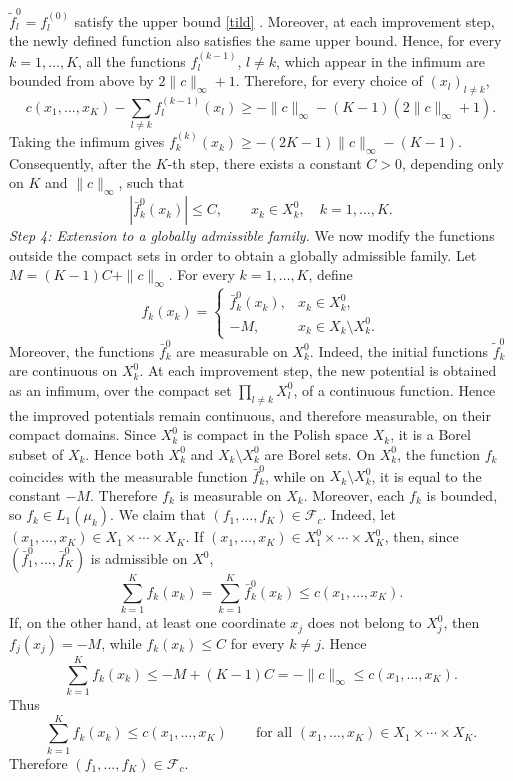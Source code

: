 \documentclass[twoside,11pt,a4paper]{article}
\newcommand*{\SavedEqref}{}
\let\SavedEqref\eqref
\renewcommand*{\eqref}[1]{  \begingroup
    \hypersetup{
      linkcolor=linkequation,
      linkbordercolor=linkequation,
    }    \SavedEqref{#1}  \endgroup
}
\begin{document}
\(\widetilde f_l^0=f_l^{(0)}\) satisfy the upper bound \eqref{tild}. Moreover,
at each improvement step, the newly defined function also satisfies the same
upper bound. Hence, for every \(k=1,\ldots,K\), all the functions
\(f_l^{(k-1)}\), \(l\ne k\), which appear in the infimum are bounded from above
by \(2\|c\|_\infty+1\). Therefore, for every choice of \((x_l)_{l\ne k}\),
\[
c(x_1,\ldots,x_K)
-
\sum_{l\ne k}f_l^{(k-1)}(x_l)
\ge
-\|c\|_\infty-(K-1)(2\|c\|_\infty+1).
\]
Taking the infimum gives $
f_k^{(k)}(x_k)
\ge
-(2K-1)\|c\|_\infty-(K-1)$.
Consequently, after the \(K\)-th step, there exists a constant \(C>0\),
depending only on \(K\) and \(\|c\|_\infty\), such that
\[
|\bar f_k^0(x_k)|\le C,
\qquad x_k\in X_k^0,\quad k=1,\ldots,K.
\]
\medskip
\noindent\emph{Step 4: Extension to a globally admissible family.}
We now modify the functions outside the compact sets in order to obtain a
globally admissible family. Let $
M=(K-1)C+\|c\|_\infty$.
For every \(k=1,\ldots,K\), define
\[
f_k(x_k)
=
\begin{cases}
\bar f_k^0(x_k), & x_k\in X_k^0,\\
-M, & x_k\in X_k\setminus X_k^0.
\end{cases}
\]
Moreover, the functions \(\bar f_k^0\) are measurable on \(X_k^0\). Indeed,
the initial functions \(\widetilde f_k^0\) are continuous on \(X_k^0\). At each
improvement step, the new potential is obtained as an infimum, over the compact
set \(\prod_{l\ne k}X_l^0\), of a continuous function. Hence the improved
potentials remain continuous, and therefore measurable, on their compact
domains.
Since \(X_k^0\) is compact in the Polish space \(X_k\), it is a Borel subset of
\(X_k\). Hence both \(X_k^0\) and \(X_k\setminus X_k^0\) are Borel sets. On
\(X_k^0\), the function \(f_k\) coincides with the measurable function
\(\bar f_k^0\), while on \(X_k\setminus X_k^0\), it is equal to the constant
\(-M\). Therefore \(f_k\) is measurable on \(X_k\).
Moreover, each \(f_k\) is bounded, so
\(f_k\in L_1(\mu_k)\).
We claim that $
(f_1,\ldots,f_K)\in\mathcal F_c$.
Indeed, let \((x_1,\ldots,x_K)\in X_1\times\cdots\times X_K\). If
\((x_1,\ldots,x_K)\in X_1^0\times\cdots\times X_K^0\), then, since
\((\bar f_1^0,\ldots,\bar f_K^0)\) is admissible on \(X^0\),
\[
\sum_{k=1}^K f_k(x_k)
=
\sum_{k=1}^K \bar f_k^0(x_k)
\le c(x_1,\ldots,x_K).
\]
If, on the other hand, at least one coordinate \(x_j\) does not belong to
\(X_j^0\), then \(f_j(x_j)=-M\), while \(f_k(x_k)\le C\) for every
\(k\ne j\). Hence
\[
\sum_{k=1}^K f_k(x_k)
\le
-M+(K-1)C
=
-\|c\|_\infty
\le
c(x_1,\ldots,x_K).
\]
Thus
\[
\sum_{k=1}^K f_k(x_k)\le c(x_1,\ldots,x_K)
\qquad
\text{for all }(x_1,\ldots,x_K)\in X_1\times\cdots\times X_K.
\]
Therefore \((f_1,\ldots,f_K)\in\mathcal F_c\).
\end{document}
